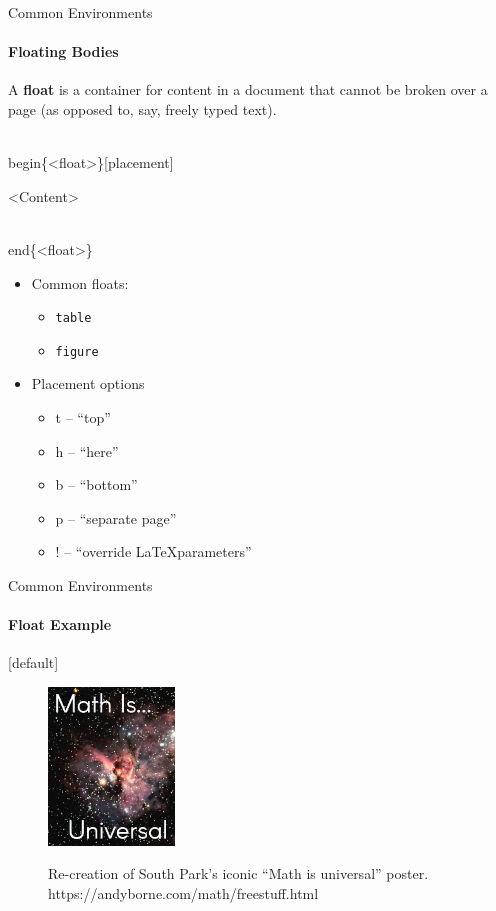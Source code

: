 \documentclass{beamer}
\begin{document}
\begin{frame}{Common Environments}
\framesubtitle{Floating Bodies}
	A \textbf{float} is a container for content in a document that cannot be broken over a page (as opposed to, say, freely typed text).
	\begin{semiverbatim}
		\\begin\{<float>\}[placement]
		
		 <Content>
			
		\\end\{<float>\}
	\end{semiverbatim}
	\begin{itemize}
		\item<2-> Common floats:
			\begin{itemize}
				\item \texttt{table}
				\item \texttt{figure}
			\end{itemize}
		\item<3-> Placement options
			\begin{itemize}
				\item t -- ``top''
				\item h -- ``here''
				\item b -- ``bottom''
				\item p -- ``separate page''
				\item ! -- ``override \LaTeX parameters''
			\end{itemize}
	\end{itemize}
\end{frame}

\begin{frame}{Common Environments}
\framesubtitle{Float Example}
	[default]
	\begin{figure}[h]
		\includegraphics[width=0.3\textwidth]{math_universal.png}
		\label{fig:math_universal}
		\caption{Re-creation of South Park's iconic ``Math is universal'' poster. https://andyborne.com/math/freestuff.html}
	\end{figure}
\end{frame}
\end{document}
